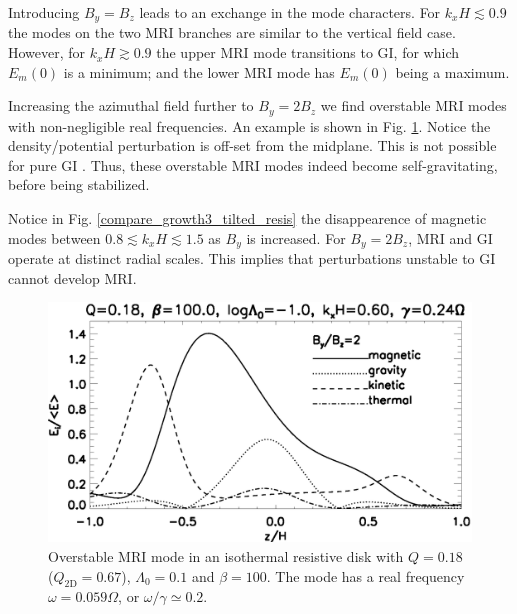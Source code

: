 Introducing $B_y = B_z$ leads to an exchange in the mode
characters. For $k_xH\lesssim 0.9$ the modes on the two MRI branches
are similar to the vertical field case. However, for $k_xH\gtrsim0.9$ 
the upper MRI mode transitions to GI, for which $E_m(0)$ is a
minimum; and the lower MRI mode has $E_m(0)$ being a maximum. 
  

Increasing the azimuthal field further to $B_y=2B_z$ we find
overstable MRI modes \citep{gammie96} with non-negligible real
frequencies. An example is shown in
Fig. \ref{result_tilted_overstable}. Notice the density/potential
perturbation is off-set from the midplane. This is not possible for
pure GI \citep{goldreich65a}. Thus, these overstable MRI modes indeed
become self-gravitating, before being stabilized. 

Notice in Fig. \ref{compare_growth3_tilted_resis} the disappearence of
magnetic modes between $0.8\lesssim k_xH\lesssim 1.5$ as $B_y$ is
increased. For $B_y=2B_z$, MRI and GI operate at distinct radial
scales. This implies that perturbations unstable to GI cannot develop
MRI.       




\begin{figure}
  \includegraphics[width=\linewidth,clip=true,trim=0cm 0cm 0cm
    0cm]{figures/result_tilted_resis.ps}
  \caption{Overstable MRI mode in an isothermal resistive disk with
    $Q=0.18$ ($Q_\mathrm{2D} = 0.67$), $\Lambda_0=0.1$ and $\beta=100$. 
    The mode has a real frequency $\omega = 0.059\Omega$, or
    $\omega/\gamma \simeq 0.2 $.   
    \label{result_tilted_overstable}}
\end{figure}



